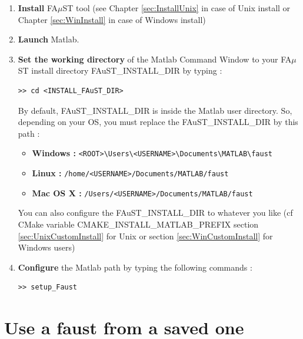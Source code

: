 \begin{enumerate}
	\item \textbf{Install} FA$\mu$ST tool (see Chapter \ref{sec:InstallUnix} in case of Unix install or Chapter \ref{sec:WinInstall} in case of Windows install)
	\item \textbf{Launch} Matlab.
	\item \textbf{Set the working directory} of the Matlab Command Window to your FA$\mu$ST install directory FAuST\_INSTALL\_DIR by typing :
		      	\begin{lstlisting}[style=customMatlab]
>> cd <INSTALL_FAuST_DIR>\end{lstlisting}	
	By default, FAuST\_INSTALL\_DIR is inside the Matlab user directory. So, depending on your OS, you must replace the FAuST\_INSTALL\_DIR by this path :
		\begin{itemize} 
			\item \textbf{Windows  :} \texttt{<ROOT>\textbackslash Users\textbackslash <USERNAME>\textbackslash Documents\textbackslash MATLAB\textbackslash faust}
			\item \textbf{Linux    :}   \texttt{/home/<USERNAME>/Documents/MATLAB/faust}
			\item \textbf{Mac OS X :}  \texttt{/Users/<USERNAME>/Documents/MATLAB/faust}
		\end{itemize}
	You can also configure the FAuST\_INSTALL\_DIR to whatever you like (cf CMake variable CMAKE\_INSTALL\_MATLAB\_PREFIX section 		\ref{sec:UnixCustomInstall} for Unix or section \ref{sec:WinCustomInstall} for Windows users)
	



	\item \textbf{Configure} the Matlab path by typing the following commands :
	\lstset{style=customMatlab}
	\begin{lstlisting}
>> setup_Faust\end{lstlisting}
\end{enumerate}





\section{Use a faust from a saved one}\label{sec:firstUseBuildFromSave}
